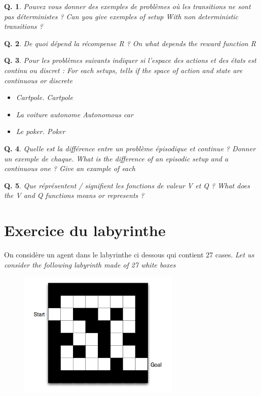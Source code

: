 \documentclass[a4paper]{exam}
\newtheorem{question}{{\bf Q.}}[section]
\begin{document}
\begin{question}
	Pouvez vous donner des exemples de problèmes où les transitions ne sont pas déterministes ? \em{Can you give exemples of setup With non deterministic transitions ?}
\end{question}

\begin{question}
	De quoi dépend la récompense R ? \em{On what depends the reward function R}
\end{question}

\begin{question}
 Pour les problèmes suivants indiquer si l'espace des actions et des états est continu ou discret : \em{For each setups, tells if the space of action and state are continuous or discrete}

 \begin{itemize}
 	\item{Cartpole. \em{Cartpole}} 
 	\item{La voiture autonome \em{Autonomous car}}
 	\item{Le poker. \em{Poker}}
 	\end{itemize}

\end{question}


\begin{question}
Quelle est la différence entre un problème épisodique et continue ? Donner un exemple de chaque. \em{What is the difference of an episodic setup and a continuous one ? Give an example of each}
\end{question}

\begin{question}
Que réprésentent / signifient les fonctions de valeur V et Q ? \em{What does the V and Q functions means or represents ?}
\end{question}

\section{Exercice du labyrinthe}

On considère un agent dans le labyrinthe ci dessous qui contient 27 cases. \em{Let us consider the following labyrinth made of 27 white boxes}

\begin{figure}[h]
	\begin{center}
		\includegraphics*[height=6cm]{maze.png}
	\end{center}
\end{figure}
\end{document}
